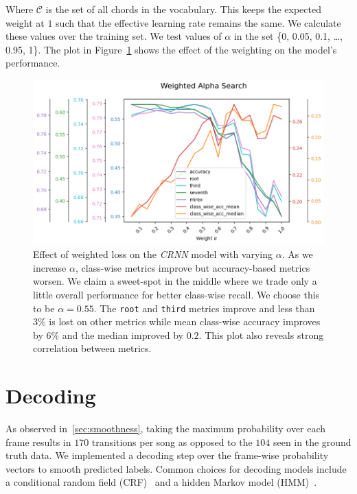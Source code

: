 Where $\mathcal{C}$ is the set of all chords in the vocabulary. This keeps the expected weight at $1$ such that the effective learning rate remains the same. We calculate these values over the training set. We test values of $\alpha$ in the set \{0, 0.05, 0.1, \ldots, 0.95, 1\}. The plot in Figure~\ref{fig:weighted_loss} shows the effect of the weighting on the model's performance.

\begin{figure}[H]
    \centering
    \includegraphics[width=1.0\textwidth]{figures/weight_alpha_search.png}
    \caption{Effect of weighted loss on the \emph{CRNN} model with varying $\alpha$. As we increase $\alpha$, class-wise metrics improve but accuracy-based metrics worsen. We claim a sweet-spot in the middle where we trade only a little overall performance for better class-wise recall. We choose this to be $\alpha = 0.55$. The \texttt{root} and \texttt{third} metrics improve and less than $3\%$ is lost on other metrics while mean class-wise accuracy improves by $6\%$ and the median improved by $0.2$. This plot also reveals strong correlation between metrics. }\label{fig:weighted_loss}
\end{figure}

\section{Decoding}\label{sec:decoding}

As observed in~\ref{sec:smoothness}, taking the maximum probability over each frame results in $170$ transitions per song as opposed to the $104$ seen in the ground truth data. We implemented a decoding step over the frame-wise probability vectors to smooth predicted labels. Common choices for decoding models include a conditional random field (CRF)~\citep{ACRLargeVocab1, BTC} and a hidden Markov model (HMM)~\citep{BalanceRandomForestACR}. 

